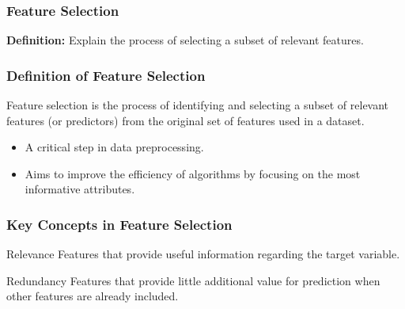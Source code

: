 \documentclass[aspectratio=169]{beamer}
\begin{document}
\begin{frame}[fragile]
    \frametitle{Feature Selection}
    \textbf{Definition:} Explain the process of selecting a subset of relevant features.
\end{frame}

\begin{frame}[fragile]
    \frametitle{Definition of Feature Selection}
    Feature selection is the process of identifying and selecting a subset of relevant features (or predictors) from the original set of features used in a dataset. 
    \begin{itemize}
        \item A critical step in data preprocessing.
        \item Aims to improve the efficiency of algorithms by focusing on the most informative attributes.
    \end{itemize}
\end{frame}

\begin{frame}[fragile]
    \frametitle{Key Concepts in Feature Selection}
    \begin{block}{Relevance}
        Features that provide useful information regarding the target variable.
    \end{block}
    
    \begin{block}{Redundancy}
        Features that provide little additional value for prediction when other features are already included.
    \end{block}
\end{frame}
\end{document}
